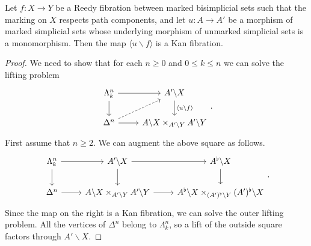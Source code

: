 \documentclass[main.tex]{subfiles}
\begin{document}
\begin{proposition}
  \label{prop:cartesian_marking_respects_path_components}
  Let $f\colon X \to Y$ be a Reedy fibration between marked bisimplicial sets such that the marking on $X$ respects path components, and let $u\colon A \to A'$ be a morphism of marked simplicial sets whose underlying morphism of unmarked simplicial sets is a monomorphism. Then the map $\langle u \backslash f \rangle$ is a Kan fibration.
\end{proposition}
\begin{proof}
  We need to show that for each $n \geq 0$ and $0 \leq k \leq n$ we can solve the lifting problem
  \begin{equation*}
    \begin{tikzcd}
      \Lambda^{n}_{k}
      \arrow[r]
      \arrow[d]
      & A' \backslash X
      \arrow[d, "\langle u \backslash f \rangle"]
      \\
      \Delta^{n}
      \arrow[r]
      \arrow[ur, dashed]
      & A \backslash X \times_{A' \backslash Y} A' \backslash Y
    \end{tikzcd}.
  \end{equation*}
  First assume that $n \geq 2$. We can augment the above square as follows.
  \begin{equation*}
    \begin{tikzcd}
      \Lambda^{n}_{k}
      \arrow[r]
      \arrow[d]
      & A' \backslash X
      \arrow[r]
      \arrow[d]
      & A^{\flat} \backslash X
      \arrow[d]
      \\
      \Delta^{n}
      \arrow[r]
      & A \backslash X \times_{A' \backslash Y} A' \backslash Y
      \arrow[r]
      & A^{\flat} \backslash X \times_{(A')^{\flat} \backslash Y} (A')^{\flat} \backslash X
    \end{tikzcd}.
  \end{equation*}
  Since the map on the right is a Kan fibration, we can solve the outer lifting problem. All the vertices of $\Delta^{n}$ belong to $\Lambda^{n}_{k}$, so a lift of the outside square factors through $A' \backslash X$.


\end{proof}
\end{document}
